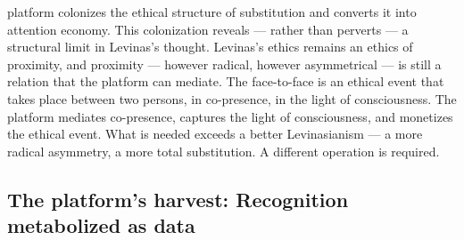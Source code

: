 platform colonizes the ethical structure of substitution and converts it into attention economy. This colonization reveals — rather than perverts — a structural limit in Levinas’s thought. Levinas’s ethics remains an ethics of proximity, and proximity — however radical, however asymmetrical — is still a relation that the platform can mediate. The face-to-face is an ethical event that takes place between two persons, in co-presence, in the light of consciousness. The platform mediates co-presence, captures the light of consciousness, and monetizes the ethical event. What is needed exceeds a better Levinasianism — a more radical asymmetry, a more total substitution. A different operation is required.

\subsection{The platform's harvest: Recognition metabolized as data}

